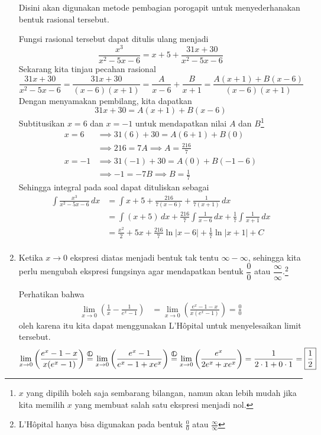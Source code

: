 \documentclass[11pt,openany,a4paper]{article}
\newcommand{\Hrule}{\stackrel{\text{\raisebox{1.5pt}{\textcircled{\raisebox{-.9pt} {L}}}}}{=}}
\begin{document}
\begin{enumerate}
        Disini akan digunakan metode pembagian porogapit untuk menyederhanakan bentuk rasional tersebut.
        \begin{center}
        \end{center}
        Fungsi rasional tersebut dapat ditulis ulang menjadi
        \[
          \frac{x^3}{x^2 - 5x - 6} = x + 5 + \frac{31x+30}{x^2 - 5x - 6}
        \]
        Sekarang kita tinjau pecahan rasional
        \[
          \frac{31x+30}{x^2 - 5x - 6} = \frac{31x+30}{(x-6)(x+1)} = \frac{A}{x-6} + \frac{B}{x+1} = \frac{A(x+1) + B(x-6)}{(x-6)(x+1)}
        \]
        Dengan menyamakan pembilang, kita dapatkan
        \[
          31x + 30 = A(x+1) + B(x-6)
        \]
        Subtitusikan $x=6$ dan $x=-1$ untuk mendapatkan nilai $A$ dan $B$\footnote{$x$ yang dipilih boleh saja sembarang bilangan, namun akan lebih mudah jika kita memilih $x$ yang membuat salah satu ekspresi menjadi nol.}
        \begin{align*}
          x = 6 &\implies 31(6) + 30 = A(6+1) + B(0) \\
          &\implies 216 = 7A \implies A = \frac{216}{7} \\
          x = -1 &\implies 31(-1) + 30 = A(0) + B(-1-6) \\
          &\implies -1 = -7B \implies B = \frac{1}{7}    
        \end{align*}
        Sehingga integral pada soal dapat dituliskan sebagai
        \begin{align*}
          \int \frac{x^3}{x^2 - 5x - 6}\,dx &= \int x + 5 + \frac{216}{7(x-6)} + \frac{1}{7(x+1)}\,dx \\
          &= \int (x + 5)\,dx + \frac{216}{7}\int \frac{1}{x-6}\,dx + \frac{1}{7}\int \frac{1}{x+1}\,dx \\
          &= \boxed{\frac{x^2}{2} + 5x + \frac{216}{7}\ln|x-6| + \frac{1}{7}\ln|x+1| + C} \\
        \end{align*}

        \item Ketika $x\to 0$ ekspresi diatas menjadi bentuk tak tentu $\infty - \infty$, sehingga kita perlu mengubah ekspresi fungsinya agar mendapatkan bentuk $\dfrac{0}{0}$ atau $\dfrac{\infty}{\infty}$.\footnote{L'Hôpital hanya bisa digunakan pada bentuk $\frac{0}{0}$ atau $\frac{\infty}{\infty}$}
        
        Perhatikan bahwa
        \begin{align*}
          \lim_{x\to 0}\left(\frac{1}{x} - \frac{1}{e^x - 1}\right) &= \lim_{x\to 0}\left(\frac{e^x - 1 - x}{x(e^x - 1)}\right) = \frac{0}{0}
        \end{align*}
        oleh karena itu kita dapat menggunakan L'Hôpital untuk menyelesaikan limit tersebut.
        \begin{align*}
          \lim_{x\to 0}\left(\frac{e^x - 1 - x}{x(e^x - 1)}\right)\Hrule\lim_{x\to 0}\left(\frac{e^x - 1}{e^x - 1 + xe^x}\right)\Hrule \lim_{x\to 0}\left(\frac{e^x}{2e^x + xe^x}\right) = \frac{1}{2\cdot1+0\cdot1}=\boxed{\frac{1}{2}}
        \end{align*}
    \end{enumerate}
\end{document}
